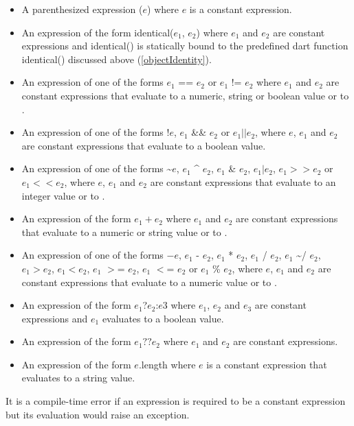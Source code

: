 \documentclass{article}
\newcommand{\code}[1]{{\sf #1}}
\begin{document}
\begin{itemize}
\item A parenthesized expression \code{($e$)} where $e$ is a constant expression.
\item An expression of the form \code{identical($e_1$, $e_2$)} where $e_1$ and $e_2$ are constant expressions  and \code{identical()} is statically bound to the predefined dart function   \code{identical()} discussed above (\ref{objectIdentity}).
\item An expression of one of the forms  \code{$e_1$ == $e_2$} or  \code{$e_1$ != $e_2$} where $e_1$ and $e_2$ are constant expressions that evaluate to a numeric, string or boolean value or to \NULL{}.
\item An expression of one of the forms \code{!$e$}, \code{$e_1$ \&\& $e_2$} or \code{$e_1 || e_2$}, where  $e$, $e_1$ and $e_2$ are constant expressions that evaluate to a boolean value.
\item An expression of one of the forms \~{}$e$, $e_1$ \^{} $e_2$, \code{$e_1$ \& $e_2$}, $e_1 | e_2$, $e_1 >> e_2$ or $e_1 <<  e_2$, where  $e$, $e_1$ and $e_2$ are constant expressions that evaluate to an integer value  or to \NULL{}.
\item An expression of the form \code{$e_1 + e_2$} where $e_1$ and $e_2$ are constant expressions that evaluate to a numeric or string value or to \NULL{}.
\item An expression of one of the forms \code{$-e$}, \code{$e_1$ - $e_2$}, \code{$e_1$ * $e_2$}, \code{$e_1$ / $e_2$,} \code{$e_1$ \~{}/ $e_2$},  \code{$e_1  >  e_2$}, \code{$e_1  <  e_2$}, \code{$e_1$ $>$= $e_2$}, \code{$e_1$ $<$= $e_2$} or \code{$e_1$ \% $e_2$},  where $e$, $e_1$ and $e_2$ are constant expressions that evaluate to a numeric value  or to \NULL{}.
\item An expression of the form \code{$e_1$?$e_2$:$e3$} where $e_1$, $e_2$ and $e_3$ are constant expressions and $e_1$ evaluates to a boolean value.
\item An expression of the form \code{$e_1 ?? e_2$} where $e_1$ and $e_2$ are constant expressions.
\item An expression of the form \code{$e$.length} where $e$ is a constant expression that evaluates to a string value.
\end{itemize}



\LMHash{}
It is a compile-time error if an expression is required to be a constant expression but its evaluation  would raise an exception. 
\end{document}
